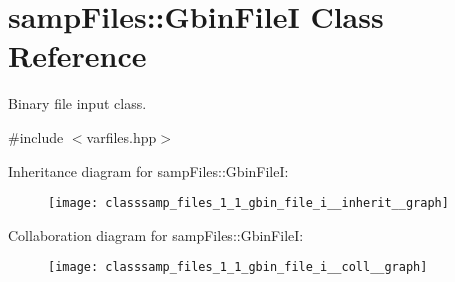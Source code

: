 \hypertarget{classsamp_files_1_1_gbin_file_i}{}\section{samp\+Files\+:\+:Gbin\+FileI Class Reference}
\label{classsamp_files_1_1_gbin_file_i}


Binary file input class.  




{\ttfamily \#include $<$varfiles.\+hpp$>$}



Inheritance diagram for samp\+Files\+:\+:Gbin\+FileI\+:\nopagebreak
\begin{figure}[H]
\begin{center}
\leavevmode
\texttt{[image: classsamp\_files\_1\_1\_gbin\_file\_i\_\_inherit\_\_graph]}
\end{center}
\end{figure}


Collaboration diagram for samp\+Files\+:\+:Gbin\+FileI\+:\nopagebreak
\begin{figure}[H]
\begin{center}
\leavevmode
\texttt{[image: classsamp\_files\_1\_1\_gbin\_file\_i\_\_coll\_\_graph]}
\end{center}
\end{figure}
